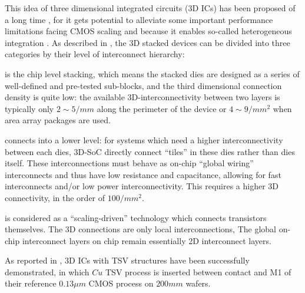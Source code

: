 This idea of three dimensional integrated circuits (3D ICs) has been proposed of a long time \cite{Beyne20043D},
for it gets potential to alleviate some important performance limitations facing CMOS scaling 
and because it enables so-called heterogeneous integration \cite{Beyne2006Rise}.
As described in \cite{Beyne20043D}, the 3D stacked devices can be divided into three categories
by their level of interconnect hierarchy:
\begin{description}[labelsep=0.5em]
    \item[3D-system-in-a-package (3D-SIP)] is the chip level stacking, which means the stacked
    dies are designed as a series of well-defined and pre-tested sub-blocks, 
    and the third dimensional connection density is quite low: the available 3D-interconnectivity 
    between two layers is typically only $2\sim5/mm$ along the perimeter of the device or $4\sim9/mm^2$
    when area array packages are used.
    
    \item[3D-system-on-a-chip (3D-SoC)] connects into a lower level: for systems which need a higher
    interconnectivity between each dies, 3D-SoC directly connect ``tiles'' in these dies rather than dies
    itself. These interconnections must behave as on-chip ``global wiring'' interconnects and thus have low
    resistance and capacitance, allowing for fast interconnects and/or low power interconnectivity.
    This requires a higher 3D connectivity, in the order of $100/mm^2$.
    
    \item[3D-integrated circuit (3D-IC)] is considered as a ``scaling-driven'' technology 
    which connects transistors themselves. The 3D connections are only local interconnections,
    The global on-chip interconnect layers on chip remain essentially 2D interconnect layers.
\end{description}


As reported in \cite{Olmen20083D}, 3D ICs with TSV structures have been successfully demonstrated, 
in which $Cu$ TSV process is inserted between contact and M1 of their reference $0.13 \mu m$ CMOS process on
$200mm$ wafers. 

